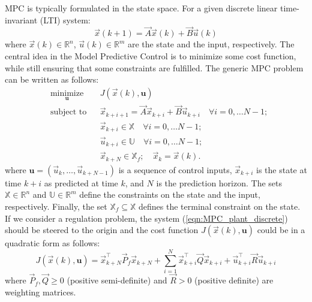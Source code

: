 MPC is typically formulated in the state space. For a given discrete linear time-invariant (LTI) system:
\begin{equation}
\label{eqn:MPC_plant_discrete}
\vec{x}(k+1)=\vec{A}\vec{x}(k)+ \vec{B} \vec{u}(k)
\end{equation}
where $\vec{x}(k)\in\mathbb{R}^n$, $\vec{u}(k)\in\mathbb{R}^m$ are the state and the input, respectively. The central idea in the Model Predictive Control is to minimize some cost function, while still ensuring that some constraints are fulfilled. The generic MPC problem can be written as follows:
\begin{equation}
\label{eqn:MPC_optimization}
\begin{aligned}
& \underset{\textbf{u}}{\text{minimize}}
& & J(\vec{x}(k), \textbf{u}) \\
& \text{subject to}
& & \vec{x}_{k+i+1} = \vec{A}\vec{x}_{k+i}+ \vec{B} \vec{u}_{k+i}\quad\forall i=0,\dots N-1;\\
& & & \vec{x}_{k+i}\in \mathbb{X}\quad\forall i=0,\dots N-1;\\
& & & \vec{u}_{k+i}\in \mathbb{U}\quad\forall i=0,\dots N-1;\\  
& & & \vec{x}_{k+N}\in \mathbb{X}_f;\quad\vec{x}_k = \vec{x}(k).
\end{aligned}
\end{equation}
where $\textbf{u}=(\vec{u}_k,\dots,\vec{u}_{k+N-1})$ is a sequence of control inputs, $\vec{x}_{k+i}$ is the state at time $k+i$ as predicted at time $k$, and $N$ is the prediction horizon. The sets $\mathbb{X}\in\mathbb{R}^n$ and $\mathbb{U}\in\mathbb{R}^m$ define the constraints on the state and the input, respectively. Finally, the set $\mathbb{X}_f\subseteq\mathbb{X}$ defines the terminal constraint on the state. If we consider a regulation problem, the system (\ref{eqn:MPC_plant_discrete}) should be steered to the origin and the cost function $J(\vec{x}(k), \textbf{u})$ could be in a quadratic form as follows:
\begin{equation}
\label{eqn:MPC_cost_function_regulation}
	J(\vec{x}(k), \textbf{u}) = \vec{x}^\intercal_{k+N}\vec{P}_f\vec{x}_{k+N}+\sum_{i=1}^{N}\vec{x}^\intercal_{k+i}\vec{Q}\vec{x}_{k+i}+\vec{u}_{k+i}^\intercal\vec{R}\vec{u}_{k+i}
\end{equation}
where $\vec{P}_f,\vec{Q}\geq0$ (positive semi-definite) and $\vec{R}>0$ (positive definite) are weighting matrices.

